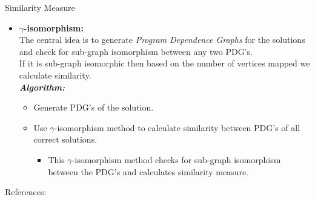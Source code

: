 \documentclass{beamer}
\begin{document}
\begin{frame}{Similarity Measure}
\begin{itemize}
    \item[] \textbf{$\gamma$-isomorphism:}\cite{Liu:2006:GDS:1150402.1150522}\\ 
   The central idea is to generate \textit{Program Dependence Graphs} for the solutions and check for sub-graph isomorphism between any two PDG's.\\
   If it is sub-graph isomorphic then based on the number of vertices mapped we calculate similarity.\\
    
    \textit{\textbf{Algorithm:}}
    \begin{itemize}
    \item Generate PDG's of the solution.
    \item Use $\gamma$-isomorphism method to calculate similarity between PDG's of all correct solutions. 
    \begin{itemize}
        \item This $\gamma$-isomorphism method checks for sub-graph isomorphism between the PDG's and calculates similarity measure.  
    \end{itemize}
    
    \end{itemize} 
\end{itemize}
  

\end{frame}

\begin{frame}{References:}
    
\printbibliography

\end{frame}
\end{document}
